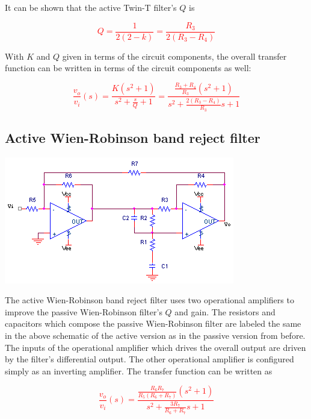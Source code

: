 It can be shown \autocite[322]{op-amps-for-everyone} that the active Twin-T filter's $Q$ is

\textcolor{red}{
\begin{equation}
Q = \frac{1}{2(2-k)} = \frac{R_{3}}{2(R_{3}-R_{4})}
\end{equation}
}

With $K$ and $Q$ given in terms of the circuit components, the overall transfer function can be written in terms of the circuit components as well:

\textcolor{red}{
\begin{equation}
\frac{v_{o}}{v_{i}}(s) = \frac{K(s^{2}+1)}{s^{2}+\frac{s}{Q}+1} =  \frac{\frac{R_{3}+R_{4}}{R_{3}}(s^{2}+1)}{s^{2}+\frac{2(R_{3}-R_{4})}{R_{3}}s+1}
\end{equation}
}

\subsection{Active Wien-Robinson band reject filter}
\begin{center}
	\includegraphics{schematics/activeWien-Robinsonbandrejectfilter.PNG}
\end{center}
The active Wien-Robinson band reject filter uses two operational amplifiers to improve the passive Wien-Robinson filter's $Q$ and gain. The resistors and capacitors which compose the passive Wien-Robinson filter are labeled the same in the above schematic of the active version as in the passive version from before. The inputs of the operational amplifier which drives the overall output are driven by the filter's differential output. The other operational amplifier is configured simply as an inverting amplifier. The transfer function \autocite[323]{op-amps-for-everyone} can be written as

\textcolor{red}{
\begin{equation}
\frac{v_{o}}{v_{i}}(s) = \frac{\frac{R_{6}R_{7}}{R_{5}(R_{6}+R_{7})}(s^{2}+1)}{s^{2}+\frac{3R_{7}}{R_{6}+R_{7}}s+1}
\label{eq:activeWienRobinsonbandreject}
\end{equation}
}

